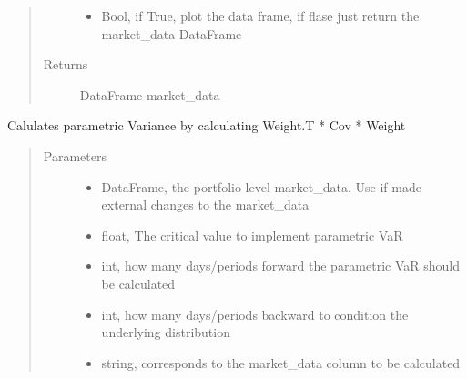 \documentclass[letterpaper,10pt,english]{sphinxmanual}
\begin{document}
\begin{fulllineitems}
\begin{fulllineitems}
\begin{quote}
\begin{description}
\begin{itemize}
\item {} 
 \textendash{} Bool, if True, plot the data frame, if flase just return the market\_data DataFrame

\end{itemize}

\item[{Returns}] \leavevmode
DataFrame market\_data

\end{description}\end{quote}

\end{fulllineitems}


\begin{fulllineitems}
\label{\detokenize{securities:risk_dash.securities.Portfolio.set_port_variance}}
Calulates parametric Variance by calculating Weight.T * Cov * Weight
\begin{quote}\begin{description}
\item[{Parameters}] \leavevmode\begin{itemize}
\item {} 
 \textendash{} DataFrame, the portfolio level market\_data. Use if made external changes to the market\_data

\item {} 
 \textendash{} float, The critical value to implement parametric VaR

\item {} 
 \textendash{} int, how many days/periods forward the parametric VaR should be calculated

\item {} 
 \textendash{} int, how many days/periods backward to condition the underlying distribution

\item {} 
 \textendash{} string, corresponds to the market\_data column to be calculated


\end{itemize}
\end{description}
\end{quote}
\end{fulllineitems}
\end{fulllineitems}
\end{document}
